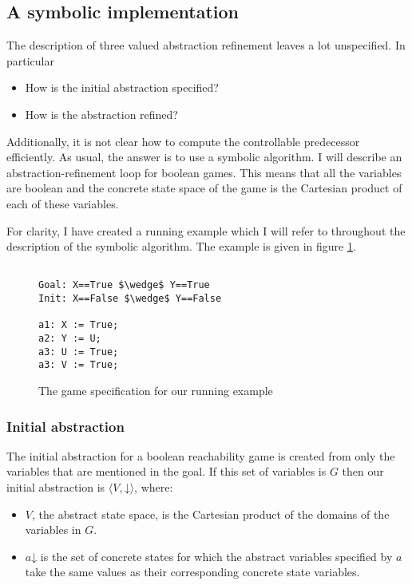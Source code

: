 \documentclass{book}
\newcommand{\concrete}[1]{#1\mathord{\downarrow}}
\theoremstyle{definition}
\begin{document}
\subsection{A symbolic implementation}

The description of three valued abstraction refinement leaves a lot unspecified. In particular

\begin{itemize}
    \item How is the initial abstraction specified?
    \item How is the abstraction refined?
\end{itemize}

Additionally, it is not clear how to compute the controllable predecessor efficiently. As usual, the answer is to use a symbolic algorithm. I will describe an abstraction-refinement loop for boolean games. This means that all the variables are boolean and the concrete state space of the game is the Cartesian product of each of these variables.

For clarity, I have created a running example which I will refer to throughout the description of the symbolic algorithm. The example is given in figure \ref{fig:running_example}.

\lstset{
    numbers=left,
    frame=single
}

\begin{figure}
    \begin{lstlisting}[mathescape]

Goal: X==True $\wedge$ Y==True
Init: X==False $\wedge$ Y==False

a1: X := True;
a2: Y := U;
a3: U := True;
a3: V := True;

\end{lstlisting}
\caption{The game specification for our running example}
\label{fig:running_example}
\end{figure}

\subsubsection{Initial abstraction}

The initial abstraction for a boolean reachability game is created from only the variables that are mentioned in the goal. If this set of variables is $G$ then our initial abstraction is $\langle V, \concrete{} \rangle$, where:
\begin{itemize}
    \item $V$, the abstract state space, is the Cartesian product of the domains of the variables in $G$.
    \item $\concrete{a}$ is the set of concrete states for which the abstract variables specified by $a$ take the same values as their corresponding concrete state variables.
\end{itemize}
\end{document}
